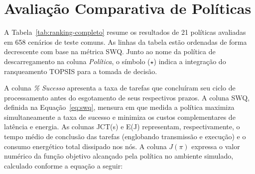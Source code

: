 



\section{Avaliação Comparativa de Políticas}
\label{sec:ranking-completo}

A Tabela~\ref{tab:ranking-completo} resume os resultados de 21 políticas avaliadas em 658 cenários de teste comuns. As linhas da tabela estão ordenadas de forma decrescente com base na métrica \gls{SWQ}. Junto ao nome da política de descarregamento na coluna \textit{Política}, o símbolo ($\star$) indica a integração do ranqueamento \gls{TOPSIS} para a tomada de decisão.

A coluna \textit{\% Sucesso} apresenta a taxa de tarefas que concluíram seu ciclo de processamento antes do esgotamento de seus respectivos prazos. A coluna \gls{SWQ}, definida na Equação~\ref{eq:swq}, mensura em que medida a política maximiza simultaneamente a taxa de sucesso e minimiza os custos complementares de latência e energia. As colunas \gls{JCT}(s) e E(J) representam, respectivamente, o tempo médio de conclusão das tarefas (englobando transmissão e execução) e o consumo energético total dissipado nos nós. A coluna $J(\pi)$ expressa o valor numérico da função objetivo alcançado pela política no ambiente simulado, calculado conforme a equação a seguir:

